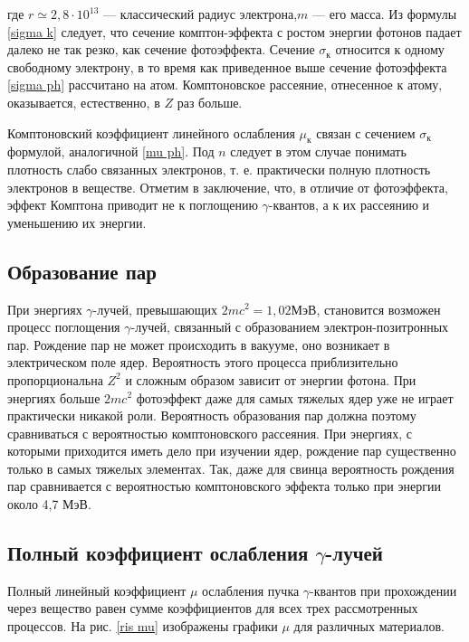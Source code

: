 \documentclass[a4paper,12pt]{report}
\begin{document}
	где $ r \simeq 2,8 \cdot 10^{13} $ --- классический радиус электрона,$ m $ --- его масса. Из формулы \eqref{sigma k} следует, что сечение комптон-эффекта с ростом энергии фотонов падает далеко не так резко, как сечение фотоэффекта.
	Сечение $ \sigma_{\text{к}} $ относится к одному свободному электрону, в то время как приведенное выше сечение фотоэффекта \eqref{sigma ph} рассчитано на атом.
	Комптоновское рассеяние, отнесенное к атому, оказывается, естественно, в $ Z $ раз больше. 
	
	Комптоновский коэффициент линейного ослабления $ \mu_{\text{к}} $ связан с
	сечением $ \sigma_{\text{к}} $ формулой, аналогичной \eqref{mu ph}. Под $ n $ следует в этом случае понимать плотность слабо связанных электронов, т. е. практически полную плотность электронов в веществе.
	Отметим в заключение, что, в отличие от фотоэффекта, эффект
	Комптона приводит не к поглощению $\gamma$-квантов, а к их рассеянию и
	уменьшению их энергии.
	
	\subsection*{Образование пар}
	
	 При энергиях $\gamma$-лучей, превышающих $ 2mc^2 = 1,02  $МэВ, становится возможен процесс поглощения $\gamma$-лучей, связанный с образованием электрон-позитронных пар. Рождение пар не
	может происходить в вакууме, оно возникает в электрическом поле
	ядер. Вероятность этого процесса приблизительно пропорциональна
	$ Z^2  $ и сложным образом зависит от энергии фотона. При энергиях больше $ 2mc^2  $ фотоэффект даже для самых тяжелых ядер уже не играет
	практически никакой роли. Вероятность образования пар должна поэтому сравниваться с вероятностью комптоновского рассеяния. При
	энергиях, с которыми приходится иметь дело при изучении ядер, рождение пар существенно только в самых тяжелых элементах. Так, даже
	для свинца вероятность рождения пар сравнивается с вероятностью
	комптоновского эффекта только при энергии около 4,7 МэВ.
	\subsection*{Полный коэффициент ослабления $\gamma$-лучей}
	
	Полный линейный коэффициент $ \mu $ ослабления пучка $\gamma$-квантов при прохождении через вещество равен сумме коэффициентов для всех трех рассмотренных процессов. На рис. \ref{ris mu} изображены графики $ \mu $ для различных материалов.
	
\end{document}

